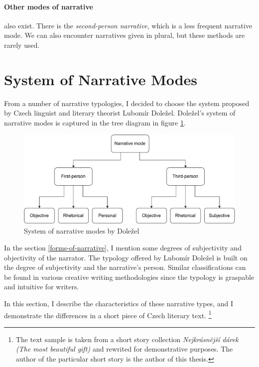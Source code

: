 \paragraph{Other modes of narrative} also exist. There is the \emph{second-person narrative}, which is a less frequent narrative mode. We can also encounter narratives given in plural, but these methods are rarely used.

\section{System of Narrative Modes}

From a number of narrative typologies, I decided to choose the system proposed by Czech linguist and literary theorist Lubomír Doležel. Doležel's system of narrative modes is captured in the tree diagram in figure \ref{fig:schema-dolezel}.\cite{dolezel-narativni-zpusoby}

\begin{figure}[ht]
\includegraphics[width=1\textwidth]{data/dolezel-schema.pdf}
\caption{System of narrative modes by Doležel}
\label{fig:schema-dolezel}
\end{figure}

In the section \ref{forms-of-narrative}, I mention some degrees of subjectivity and objectivity of the narrator. The typology offered by Lubomír Doležel is built on the degree of subjectivity and the narrative's person. Similar classifications can be found in various creative writing methodologies \cite{docekalova} since the typology is graspable and intuitive for writers.

In this section, I describe the characteristics of these narrative types, and I demonstrate the differences in a short piece of Czech literary text. \footnote{The text sample is taken from a short story collection \emph{Nejkrásnější dárek (The most beautiful gift) \cite{nejkrasnejsi-darek}} and rewrited for demonstrative purposes. The author of the particular short story is the author of this thesis.}

